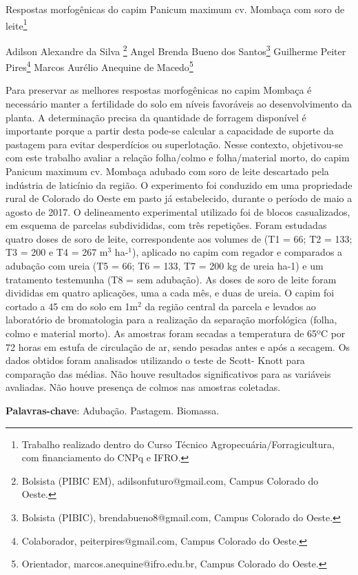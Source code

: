 \documentclass[article,12pt,onesidea,4paper,english,brazil]{abntex2}
\begin{document}
	
	
	\frenchspacing 
	
	\begin{center}
		\LARGE Respostas morfogênicas do capim Panicum maximum cv. Mombaça com soro de leite\footnote{Trabalho realizado dentro do Curso Técnico Agropecuária/Forragicultura, com financiamento do CNPq e IFRO.}
		
		\normalsize
	Adilson Alexandre da Silva	\footnote{Bolsista (PIBIC EM), adilsonfuturo@gmail.com, Campus Colorado do Oeste.} 
		Angel Brenda Bueno dos Santos\footnote{Bolsista (PIBIC), brendabueno8@gmail.com, Campus Colorado do Oeste.} 
		Guilherme Peiter Pires\footnote{Colaborador, peiterpires@gmail.com, Campus Colorado do Oeste.} 
	Marcos Aurélio Anequine de Macedo\footnote{Orientador, marcos.anequine@ifro.edu.br, Campus Colorado do Oeste.} 
	\end{center}
	
	\noindent Para preservar as melhores respostas morfogênicas no capim Mombaça é necessário manter a fertilidade do solo em níveis favoráveis ao desenvolvimento da planta. A determinação precisa da quantidade de forragem disponível é importante porque a partir desta pode-se calcular a capacidade de suporte da pastagem para evitar desperdícios ou superlotação. Nesse contexto, objetivou-se com este trabalho avaliar a relação folha/colmo e folha/material morto, do capim Panicum maximum cv. Mombaça adubado com soro de leite descartado pela indústria de laticínio da região. O experimento foi conduzido em uma propriedade rural de Colorado do Oeste em pasto já estabelecido, durante o período de maio a agosto de 2017. O delineamento experimental utilizado foi de blocos casualizados, em esquema de parcelas subdivididas, com três repetições. Foram estudadas quatro doses de soro de leite, correspondente aos volumes de (T1 = 66; T2 = 133; T3 = 200 e T4 = 267 m$^3$ ha-$^1$), aplicado no capim com regador e comparados a adubação com ureia (T5 = 66; T6 = 133, T7 = 200 kg de ureia ha-1) e um tratamento testemunha (T8 = sem adubação). As doses de soro de leite foram divididas em quatro aplicações, uma a cada mês, e duas de ureia. O capim foi cortado a 45 cm do solo em 1m$^2$ da região central da parcela e levados ao laboratório de bromatologia para a realização da separação morfológica (folha, colmo e material morto). As amostras foram secadas a temperatura de 65ºC por 72 horas em estufa de circulação de ar, sendo pesadas antes e após a secagem. Os dados obtidos foram analisados utilizando o teste de Scott- Knott para comparação das médias. Não houve resultados significativos para as variáveis avaliadas. Não houve presença de colmos nas amostras coletadas.
	
	\vspace{\onelineskip}
	
	\noindent
	\textbf{Palavras-chave}: Adubação. Pastagem. Biomassa.
	
\end{document}
